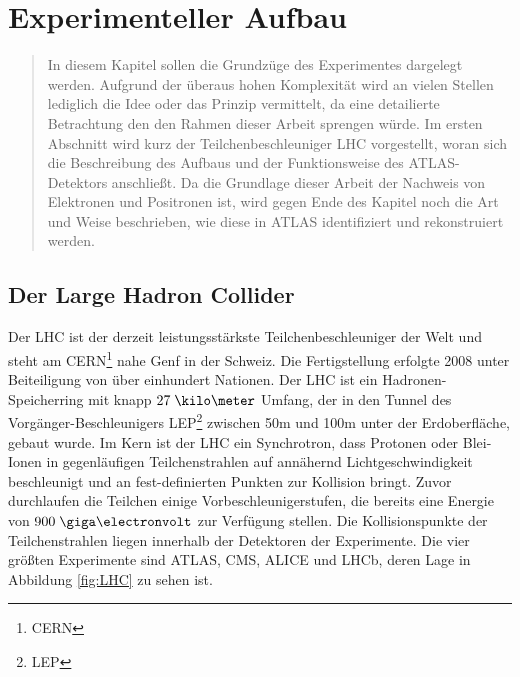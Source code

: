 
\chapter{Experimenteller Aufbau}
\label{experimenteller_aufbau}

\begin{quote}
    In diesem Kapitel sollen die Grundzüge des Experimentes dargelegt werden.
    Aufgrund der überaus hohen Komplexität wird an vielen Stellen lediglich die
    Idee oder das Prinzip vermittelt, da eine detailierte Betrachtung den den
    Rahmen dieser Arbeit sprengen würde. Im ersten Abschnitt wird kurz der
    Teilchenbeschleuniger \acs{LHC} vorgestellt, woran sich die Beschreibung
    des Aufbaus und der Funktionsweise des ATLAS-Detektors anschließt. Da die
    Grundlage dieser Arbeit der Nachweis von Elektronen und Positronen ist,
    wird gegen Ende des Kapitel noch die Art und Weise beschrieben, wie diese
    in ATLAS identifiziert und rekonstruiert werden.
\end{quote}

%
\section{Der Large Hadron Collider}
\label{lhc}

Der \acf{LHC} ist der derzeit leistungsstärkste Teilchenbeschleuniger der Welt
und steht am CERN\footnote{\acf{CERN}} nahe Genf in der Schweiz. Die
Fertigstellung erfolgte 2008 unter Beiteiligung von über einhundert Nationen.
Der \ac{LHC} ist ein Hadronen-Speicherring mit knapp $27\;\kilo\meter$ Umfang,
der in den Tunnel des Vorgänger-Beschleunigers LEP\footnote{\acf{LEP}} zwischen
50m und 100m unter der Erdoberfläche, gebaut wurde. Im Kern ist der
\ac{LHC} ein Synchrotron, dass Protonen oder Blei-Ionen in gegenläufigen
Teilchenstrahlen auf annähernd Lichtgeschwindigkeit beschleunigt und an
fest-definierten Punkten zur Kollision bringt. Zuvor durchlaufen die Teilchen
einige Vorbeschleunigerstufen, die bereits eine Energie von $900\GeV$ zur
Verfügung stellen.  Die Kollisionspunkte der Teilchenstrahlen liegen innerhalb
der Detektoren der Experimente. Die vier größten Experimente sind \acs{ATLAS},
CMS, ALICE und LHCb, deren Lage in Abbildung \ref{fig:LHC} zu sehen ist.

